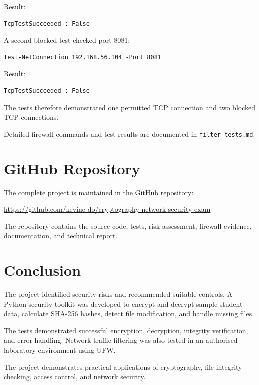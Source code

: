 \documentclass[12pt]{article}
\begin{document}
Result:

\begin{verbatim}
TcpTestSucceeded : False
\end{verbatim}

A second blocked test checked port 8081:

\begin{verbatim}
Test-NetConnection 192.168.56.104 -Port 8081
\end{verbatim}

Result:

\begin{verbatim}
TcpTestSucceeded : False
\end{verbatim}

The tests therefore demonstrated one permitted TCP connection and two blocked TCP connections.

Detailed firewall commands and test results are documented in \texttt{filter\_tests.md}.

\section{GitHub Repository}

The complete project is maintained in the GitHub repository:

\begin{center}
\url{https://github.com/kevine-do/cryptography-network-security-exam}
\end{center}

The repository contains the source code, tests, risk assessment, firewall evidence, documentation, and technical report.

\section{Conclusion}

The project identified security risks and recommended suitable controls. A Python security toolkit was developed to encrypt and decrypt sample student data, calculate SHA-256 hashes, detect file modification, and handle missing files.

The tests demonstrated successful encryption, decryption, integrity verification, and error handling. Network traffic filtering was also tested in an authorised laboratory environment using UFW.

The project demonstrates practical applications of cryptography, file integrity checking, access control, and network security.
\end{document}
